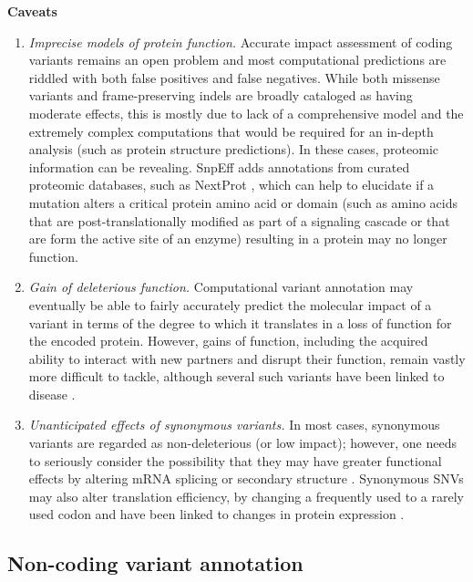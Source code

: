 \textbf{Caveats}
	\begin{enumerate}[label=\roman*]
	
	\item \textit{Imprecise models of protein function.} Accurate impact assessment of coding variants remains an open problem and most computational predictions are riddled with both false positives and false negatives. While both missense variants and frame-preserving indels are broadly cataloged as having moderate effects, this is mostly due to lack of a comprehensive model and the extremely complex computations that would be required for an in-depth analysis (such as protein structure predictions). In these cases, proteomic information can be revealing. SnpEff adds annotations from curated proteomic databases, such as NextProt  \cite{lane2012nextprot}, which can help to elucidate if a mutation alters a critical protein amino acid or domain (such as amino acids that are post-translationally modified as part of a signaling cascade or that are form the active site of an enzyme) resulting in a protein may no longer function.
	
	\item \textit{Gain of deleterious function.} Computational variant annotation may eventually be able to fairly accurately predict the molecular impact of a variant in terms of the degree to which it translates in a loss of function for the encoded protein. However, gains of function, including the acquired ability to interact with new partners and disrupt their function, remain vastly more difficult to tackle, although several such variants have been linked to disease \cite{whitcomb1996hereditary}.
	
	\item \textit{Unanticipated effects of synonymous variants.} In most cases, synonymous variants are regarded as non-deleterious (or low impact); however, one needs to seriously consider the possibility that they may have greater functional effects by altering mRNA splicing  \cite{coulombe2009fine} or secondary structure  \cite{sabarinathan2013rnasnp}. Synonymous SNVs may also alter translation efficiency, by changing a frequently used to a rarely used codon and have been linked to changes in protein expression  \cite{sauna2011understanding}.
	
	\end{enumerate}

\subsection{Non-coding variant annotation}

